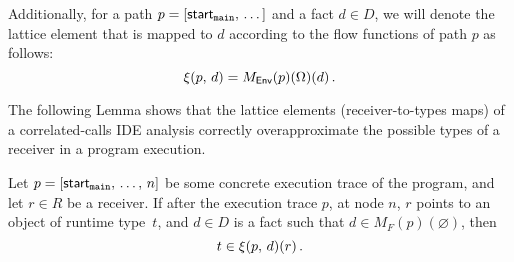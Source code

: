 Additionally, for a path $p=[\textsf{start}_\texttt{main},\,\dots]$ and a fact $d\in D$, we will denote the lattice element that is mapped to $d$ according to the flow functions of path $p$ as follows:
\begin{equation}
  \xi(p,\,d)=M_\textsf{Env}(p)(\Omega)(d)\,.
\end{equation}

The following Lemma shows that the lattice elements (receiver-to-types maps) of a correlated-calls IDE analysis correctly overapproximate the possible types of a receiver in a program execution.

\begin{lemma}\label{lem:sound1}
Let $p=[\textsf{start}_\texttt{main},\,\dots,\,n]$ be some concrete execution trace of the program, and let $r\in R$ be a receiver. If after the execution trace $p$, at node $n$, $r$ points to an object of runtime type~$t$, and $d\in D$ is a fact such that $d\in M_F(p)(\varnothing)$, then
  \begin{equation}
    t\in\xi(p,\,d)(r)\,.
  \end{equation}
\end{lemma}
